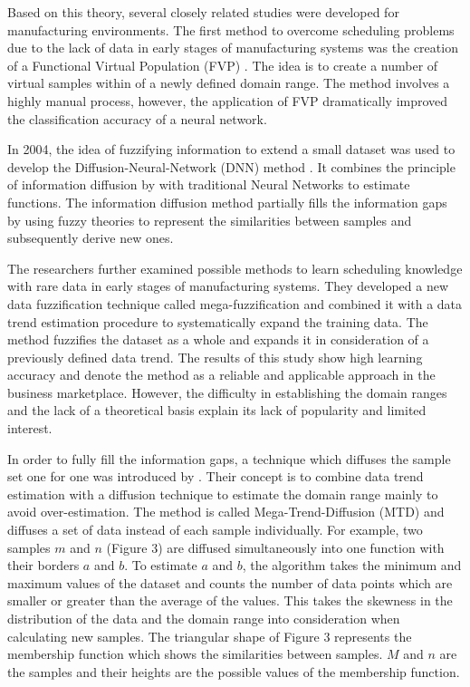 \documentclass[parskip=full]{scrartcl}
\begin{document}
Based on this theory, several closely related studies were developed for manufacturing environments. 
The first method to overcome scheduling problems due to the lack of data in early stages of 
manufacturing systems was the creation of a Functional Virtual Population (FVP) \cite{Li.2003}. The 
idea is to create a number of virtual samples within of a newly defined domain range. The method 
involves a highly manual process, however, the application of FVP dramatically improved the 
classification accuracy of a neural network. 

In 2004, the idea of fuzzifying information to extend a small dataset was used to develop the 
Diffusion-Neural-Network (DNN) method \cite{Huang.2004}. It combines the principle of information 
diffusion by \cite{Huang.1997} with  traditional Neural Networks to estimate functions. The information 
diffusion method partially fills the information gaps by using fuzzy theories to represent the similarities 
between samples and subsequently derive new ones. 

The researchers \cite{Li.2006b} further examined possible methods to learn scheduling knowledge with 
rare data in early stages of manufacturing systems. They developed a new data fuzzification technique 
called mega-fuzzification and combined it with a data trend estimation procedure to systematically 
expand the training data. The method fuzzifies the dataset as a whole and expands it in consideration of 
a previously defined data trend. The results of this study show high learning accuracy and denote the 
method as a reliable and applicable approach in the business marketplace. However, the difficulty in 
establishing the domain ranges and the lack of a theoretical basis explain its lack of popularity and 
limited interest. 

In order to fully fill the information gaps, a technique which diffuses the sample set one for one was 
introduced by \cite{Li.2007}. Their concept is to combine data trend estimation with a diffusion 
technique to estimate the domain range mainly to avoid over-estimation. The method is called 
Mega-Trend-Diffusion (MTD) and diffuses a set of data instead of each sample individually. For 
example, two samples $\mathit{m}$ and $\mathit{n}$ (Figure 3) are diffused simultaneously into one 
function with their borders $\mathit{a}$ and $\mathit{b}$. To estimate $\mathit{a}$ and $\mathit{b}$, 
the algorithm takes the minimum and maximum values of the dataset and counts the number of data 
points which are smaller or greater than the average of the values. This takes the skewness in the 
distribution of the data and the domain range into consideration when calculating new samples. The 
triangular shape of Figure 3 represents the membership function which shows the similarities between 
samples. $\mathit{M}$ and $\mathit{n}$ are the samples and their heights are 
the possible values of the membership function.
\end{document}
